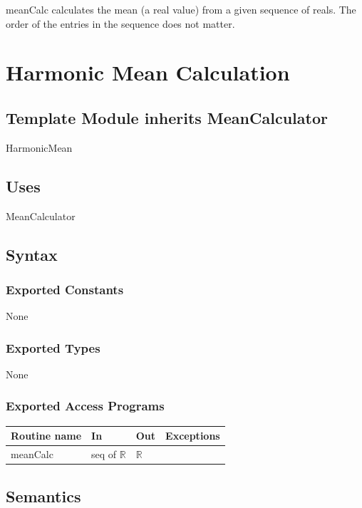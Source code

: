\documentclass[12pt,fleqn]{examtst}
\begin{document}
meanCalc calculates the mean (a real value) from a given sequence of reals.
The order of the entries in the sequence does not matter.


\newpage

\section* {Harmonic Mean Calculation}

\subsection*{Template Module inherits MeanCalculator}

HarmonicMean

\subsection* {Uses}

MeanCalculator

\subsection* {Syntax}

\subsubsection* {Exported Constants}

None

\subsubsection* {Exported Types}

None 

\subsubsection* {Exported Access Programs}

\begin{tabular}{| l | l | l | p{5cm} |}
\hline
\textbf{Routine name} & \textbf{In} & \textbf{Out} & \textbf{Exceptions}\\
\hline
meanCalc & seq of $\mathbb{R}$ & $\mathbb{R}$ & ~\\
\hline
\end{tabular}

\subsection* {Semantics}
\end{document}
